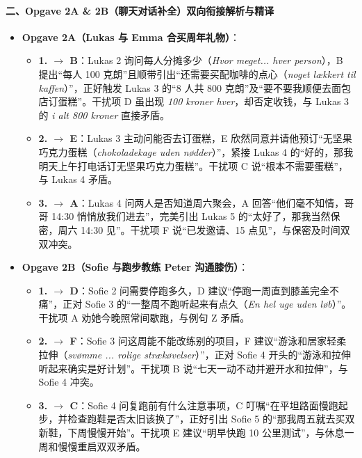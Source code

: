 \paragraph*{二、Opgave 2A \& 2B（聊天对话补全）双向衔接解析与精译}
\begin{itemize}
  \item \textbf{Opgave 2A（Lukas 与 Emma 合买周年礼物）}：
    \begin{itemize}
      \item \textbf{1. $\rightarrow$ B}：Lukas 2 询问每人分摊多少（\textit{Hvor meget... hver person}），B 提出“每人 100 克朗”且顺带引出“还需要买配咖啡的点心（\textit{noget lækkert til kaffen}）”，正好触发 Lukas 3 的“8 人共 800 克朗”及“要不要我顺便去面包店订蛋糕”。干扰项 D 虽出现 \textit{100 kroner hver}，却否定收钱，与 Lukas 3 的 \textit{i alt 800 kroner} 直接矛盾。
      \item \textbf{2. $\rightarrow$ E}：Lukas 3 主动问能否去订蛋糕，E 欣然同意并请他预订“无坚果巧克力蛋糕（\textit{chokoladekage uden nødder}）”，紧接 Lukas 4 的“好的，那我明天上午打电话订无坚果巧克力蛋糕”。干扰项 C 说“根本不需要蛋糕”，与 Lukas 4 矛盾。
      \item \textbf{3. $\rightarrow$ A}：Lukas 4 问两人是否知道周六聚会，A 回答“他们毫不知情，哥哥 14:30 悄悄放我们进去”，完美引出 Lukas 5 的“太好了，那我当然保密，周六 14:30 见”。干扰项 F 说“已发邀请、15 点见”，与保密及时间双双冲突。
    \end{itemize}
  \item \textbf{Opgave 2B（Sofie 与跑步教练 Peter 沟通膝伤）}：
    \begin{itemize}
      \item \textbf{1. $\rightarrow$ D}：Sofie 2 问需要停跑多久，D 建议“停跑一周直到膝盖完全不痛”，正对 Sofie 3 的“一整周不跑听起来有点久（\textit{En hel uge uden løb}）”。干扰项 A 劝她今晚照常间歇跑，与例句 Z 矛盾。
      \item \textbf{2. $\rightarrow$ F}：Sofie 3 问这周能不能改练别的项目，F 建议“游泳和居家轻柔拉伸（\textit{svømme ... rolige strækøvelser}）”，正对 Sofie 4 开头的“游泳和拉伸听起来确实是好计划”。干扰项 B 说“七天一动不动并避开水和拉伸”，与 Sofie 4 冲突。
      \item \textbf{3. $\rightarrow$ C}：Sofie 4 问复跑前有什么注意事项，C 叮嘱“在平坦路面慢跑起步，并检查跑鞋是否太旧该换了”，正好引出 Sofie 5 的“那我周五就去买双新鞋，下周慢慢开始”。干扰项 E 建议“明早快跑 10 公里测试”，与休息一周和慢慢重启双双矛盾。
    \end{itemize}
\end{itemize}

